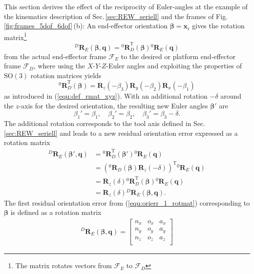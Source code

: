 \documentclass[robotics,article,submit,moreauthors,pdftex]{Definitions/mdpi}
\newcommand{\bm}[1]{\boldsymbol{#1}}
\newcommand{\rotmat}[2]{{{ }^{#1}\boldsymbol{R}}_{#2}}
\newcommand{\transp}[0]{{\mathrm{T}}}
\newcommand{\ks}[1]{{\mathcal{F}}_{#1}}
\begin{document}
This section derives the effect of the reciprocity of Euler-angles at the example of the kinematics description of Sec.\,\ref{sec:REW_seriell} and the frames of Fig.\,\ref{fig:frames_5dof_6dof}\,(b):
%
An end-effector orientation $\bm{\beta}=\bm{x}_{\mathrm{r}}$ gives the rotation matrix\footnote{The matrix rotates vectors from $\ks{E}$ to $\ks{D}$}
%
\begin{equation}
\rotmat{D}{E}(\bm{\beta},\bm{q})
= 
\rotmat{0}{D}^\transp (\bm{\beta})\rotmat{0}{E}(\bm{q})
\label{equ:orierr_1_rotmat}
\end{equation}
%
from the actual end-effector frame $\ks{E}$ to the desired or platform end-effector frame $\ks{D}$,
where using the $X$-$Y$-$Z$-Euler angles and exploiting the properties of $\mathrm{SO(3)}$ rotation matrices yields
%
\begin{equation}
\rotmat{0}{D}^\transp(\bm{\beta})
=
\bm{R}_z(-\beta_3) \bm{R}_y(-\beta_2) \bm{R}_x(-\beta_1)
\end{equation}
%
as introduced in (\ref{equ:def_rmat_xyz}).
With an additional rotation $-\delta$ around the $z$-axis for the desired orientation, the resulting new Euler angles $\bm{\beta}'$ are
%
\begin{equation}
\beta_1'=\beta_1, \quad \beta_2'=\beta_2, \quad \beta_3'=\beta_3-\delta.
\end{equation}
%
The additional rotation corresponds to the tool axis defined in Sec.\,\ref{sec:REW_seriell} %
and leads to a new residual orientation error expressed as a rotation matrix
%
\begin{align}
    \rotmat{D}{E}(\bm{\beta}',\bm{q})
    &=
    \rotmat{0}{D}^\transp (\bm{\beta}') \rotmat{0}{E}(\bm{q}) \nonumber\\
    &=
    \left(\rotmat{0}{D}(\bm{\beta})\bm{R}_z(-\delta)\right)^\transp \rotmat{0}{E}(\bm{q}) \nonumber \\
    &=
    \bm{R}_z(\delta) \rotmat{0}{D}^\transp (\bm{\beta}) \rotmat{0}{E}(\bm{q}) \nonumber \\
    &=
    \bm{R}_z(\delta) \rotmat{D}{E}(\bm{\beta},\bm{q}).
    \label{equ:orierr_2_rotmat}
\end{align}
%
The first residual orientation error from (\ref{equ:orierr_1_rotmat}) corresponding to $\bm{\beta}$ is defined as a rotation matrix
%
\begin{align}
    \rotmat{D}{E}(\bm{\beta},\bm{q})
    =
    \begin{bmatrix}
        {n_x}&{o_x}&{a_x} \\
        {n_y}&{o_y}&{a_y} \\ 
        {n_z}&{o_z}&{a_z} \\ 
    \end{bmatrix}
    \label{equ:orierr_1_rotmat_def}
\end{align}
\end{document}
